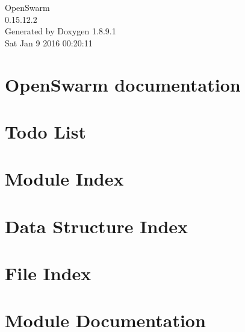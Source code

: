 \documentclass[twoside]{book}
\newcommand{\+}{\discretionary{\mbox{\scriptsize$\hookleftarrow$}}{}{}}
\newcommand{\clearemptydoublepage}{%
  \newpage{\pagestyle{empty}\cleardoublepage}%
}
\begin{document}
\hypersetup{pageanchor=false,
             bookmarks=true,
             bookmarksnumbered=true,
             pdfencoding=unicode
            }
\begin{titlepage}
\vspace*{7cm}
\begin{center}%
{\Large Open\+Swarm \\[1ex]\large 0.\+15.\+12.\+2 }\\
\vspace*{1cm}
{\large Generated by Doxygen 1.8.9.1}\\
\vspace*{0.5cm}
{\small Sat Jan 9 2016 00:20:11}\\
\end{center}
\end{titlepage}
\clearemptydoublepage
\tableofcontents
\clearemptydoublepage
{}
\hypersetup{pageanchor=true}

\chapter{Open\+Swarm documentation}
\label{index}\hypertarget{index}{}
\chapter{Todo List}
\label{dd/da0/todo}
\hypertarget{dd/da0/todo}{}

\chapter{Module Index}

\chapter{Data Structure Index}

\chapter{File Index}

\chapter{Module Documentation}











\end{document}
